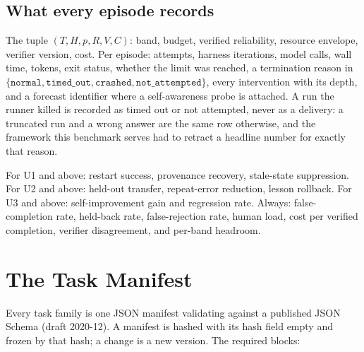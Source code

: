 \subsection{What every episode records}

The tuple $(T, H, p, R, V, C)$: band, budget, verified reliability, resource envelope, verifier version, cost. Per episode: attempts, harness iterations, model calls, wall time, tokens, exit status, whether the limit was reached, a termination reason in $\{\texttt{normal}, \texttt{timed\_out}, \texttt{crashed}, \texttt{not\_attempted}\}$, every intervention with its depth, and a forecast identifier where a self-awareness probe is attached. A run the runner killed is recorded as timed out or not attempted, never as a delivery: a truncated run and a wrong answer are the same row otherwise, and the framework this benchmark serves had to retract a headline number for exactly that reason.

For U1 and above: restart success, provenance recovery, stale-state suppression. For U2 and above: held-out transfer, repeat-error reduction, lesson rollback. For U3 and above: self-improvement gain and regression rate. Always: false-completion rate, held-back rate, false-rejection rate, human load, cost per verified completion, verifier disagreement, and per-band headroom.

\section{The Task Manifest}\label{sec:manifest}

Every task family is one JSON manifest validating against a published JSON Schema (draft 2020-12). A manifest is hashed with its hash field empty and frozen by that hash; a change is a new version. The required blocks:

